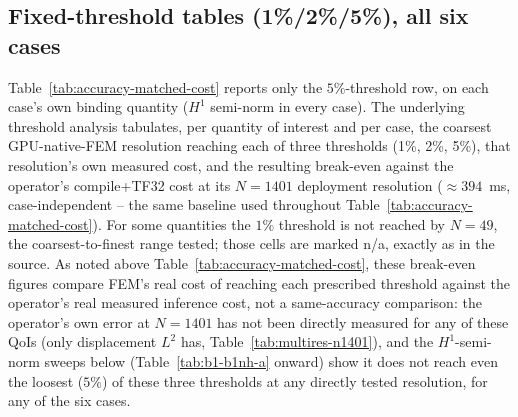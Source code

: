 \documentclass[final,5p,times]{elsarticle}
\begin{document}
\FloatBarrier
\subsection{Fixed-threshold tables (1\%/2\%/5\%), all six cases}
Table~\ref{tab:accuracy-matched-cost} reports only the $5\%$-threshold
row, on each case's own binding quantity ($H^1$ semi-norm in every case).
The underlying threshold analysis tabulates, per quantity of interest and
per case, the coarsest GPU-native-FEM resolution reaching each of three
thresholds (1\%, 2\%, 5\%), that resolution's own measured cost, and the
resulting break-even against the operator's compile+TF32 cost at its
$N{=}1401$ deployment resolution ($\approx394$~ms, case-independent --
the same baseline used throughout Table~\ref{tab:accuracy-matched-cost}).
For some quantities the $1\%$ threshold is not reached by $N{=}49$, the
coarsest-to-finest range tested; those cells are marked n/a, exactly as
in the source. As noted above Table~\ref{tab:accuracy-matched-cost}, these
break-even figures compare FEM's real cost of reaching each prescribed
threshold against the operator's real measured inference cost, not a
same-accuracy comparison: the operator's own error at $N{=}1401$ has not
been directly measured for any of these QoIs (only displacement $L^2$
has, Table~\ref{tab:multires-n1401}), and the $H^1$-semi-norm sweeps
below (Table~\ref{tab:b1-b1nh-a} onward) show it does not reach even the
loosest ($5\%$) of these three thresholds at any directly tested
resolution, for any of the six cases.
\end{document}
